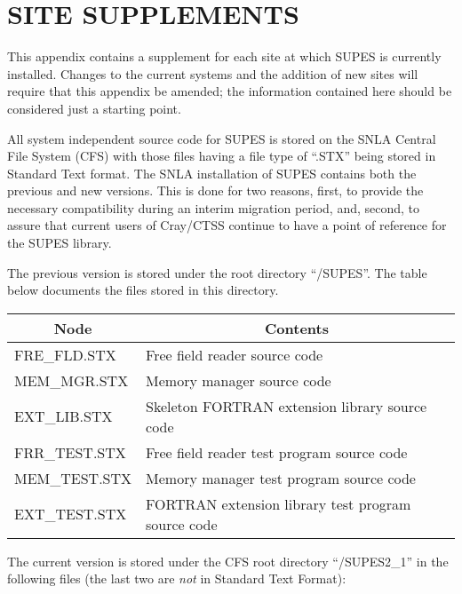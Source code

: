 \chapter{SITE SUPPLEMENTS} \label{sec:site}
This appendix contains a supplement for each site at which SUPES is
currently installed.  Changes to the current systems and the addition of new
sites will require that this appendix be amended; the information contained
here should be considered just a starting point.

All system independent source code for SUPES is stored on the SNLA Central
File System (CFS) with those files having a file type of ``.STX''
being stored in Standard Text format.
The SNLA installation of SUPES contains both the previous
and new versions.
This is done for two reasons,
first, to provide the necessary compatibility during an interim
migration period,
and,
second,
to assure that current users of Cray/CTSS continue to have a point of reference
for the SUPES library.

The previous version is stored under the root directory ``/SUPES''.
The table below documents the files stored in this directory.

\begin{tabular}{|ll|} \hline \hline
\multicolumn{1}{|c}{Node} & \multicolumn{1}{c|}{Contents} \\ \hline
FRE\_FLD.STX   &  Free field reader source code\\
MEM\_MGR.STX   &  Memory manager source code\\
EXT\_LIB.STX   &  Skeleton FORTRAN extension library source code\\
FRR\_TEST.STX  &  Free field reader test program source code\\
MEM\_TEST.STX  &  Memory manager test program source code\\
EXT\_TEST.STX  &  FORTRAN extension library test program source code\\ \hline
\hline
\end{tabular}

The current version is stored under the CFS root directory
``/SUPES2\_1'' in the following files (the last two are {\em not} in Standard Text
Format):

